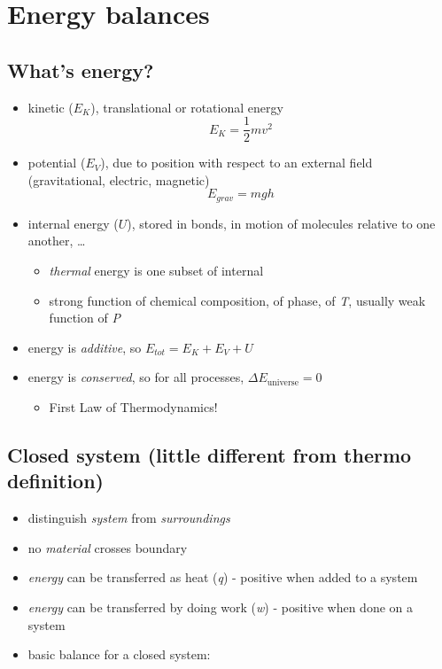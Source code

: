 \documentclass[11pt]{article}
\begin{document}
\newpage
\section{Energy balances}
\label{sec-9}
\subsection{What's energy?}
\label{sec-9-1}
\begin{itemize}
\item kinetic (\(E_{K}\)), translational or rotational energy
\[ E_{K} = \frac{1}{2} m v^{2}\]
\item potential  (\(E_{V}\)), due to position with respect to an external field (gravitational, electric, magnetic)
\[ E_{grav} = m g h \]
\item internal energy (\(U\)), stored in bonds, in motion of molecules relative to one another, \ldots{}
\begin{itemize}
\item \emph{thermal} energy is one subset of internal
\item strong function of chemical composition, of phase, of \emph{T}, usually weak function of \emph{P}
\end{itemize}
\item energy is \emph{additive}, so \( E_{tot} = E_{K} + E_{V} + U \)
\item energy is \emph{conserved}, so for all processes, \(\Delta E_{\text{universe}} = 0\)
\begin{itemize}
\item First Law of Thermodynamics!
\end{itemize}
\end{itemize}

\subsection{Closed system (little different from thermo definition)}
\label{sec-9-2}
\begin{itemize}
\item distinguish \emph{system} from \emph{surroundings}
\item no \emph{material} crosses boundary
\item \emph{energy} can be transferred as heat (\emph{q}) - positive when added to a system
\item \emph{energy} can be transferred by doing work (\emph{w}) - positive when done on a system
\item basic balance for a closed system:
\end{itemize}
\end{document}
